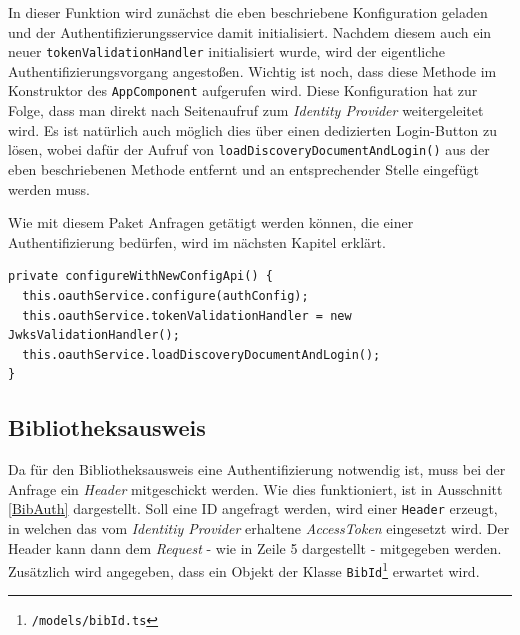 In dieser Funktion wird zunächst die eben beschriebene Konfiguration geladen und der Authentifizierungsservice damit initialisiert. Nachdem diesem auch ein neuer \texttt{tokenValidationHandler} initialisiert wurde, wird der eigentliche Authentifizierungsvorgang angestoßen. Wichtig ist noch, dass diese Methode im Konstruktor des \texttt{AppComponent} aufgerufen wird. Diese Konfiguration hat zur Folge, dass man direkt nach Seitenaufruf zum \textit{Identity Provider} weitergeleitet wird. Es ist natürlich auch möglich dies über einen dedizierten Login-Button zu lösen, wobei dafür der Aufruf von \texttt{loadDiscoveryDocumentAndLogin()} aus der eben beschriebenen Methode entfernt und an entsprechender Stelle eingefügt werden muss.

Wie mit diesem Paket Anfragen getätigt werden können, die einer Authentifizierung bedürfen, wird im nächsten Kapitel erklärt.

\begin{lstlisting}[float, floatplacement=h, style=htmlcssjs, caption={Auslösen der Authentifizierung in \texttt{AppComponent}}, label={auth}]
private configureWithNewConfigApi() {
  this.oauthService.configure(authConfig);
  this.oauthService.tokenValidationHandler = new JwksValidationHandler();
  this.oauthService.loadDiscoveryDocumentAndLogin();
}
\end{lstlisting}
\subsection{Bibliotheksausweis}
\label{sec:prog:bibID}
Da für den Bibliotheksausweis eine Authentifizierung notwendig ist, muss bei der Anfrage ein \textit{Header} mitgeschickt werden. Wie dies funktioniert, ist in Ausschnitt \ref{BibAuth} dargestellt. Soll eine ID angefragt werden, wird einer \texttt{Header} erzeugt, in welchen das vom \textit{Identitiy Provider} erhaltene \textit{AccessToken} eingesetzt wird. Der Header kann dann dem \textit{Request} - wie in Zeile 5 dargestellt - mitgegeben werden. Zusätzlich wird angegeben, dass ein Objekt der Klasse \texttt{BibId}\footnote{\texttt{/models/bibId.ts}} erwartet wird.


